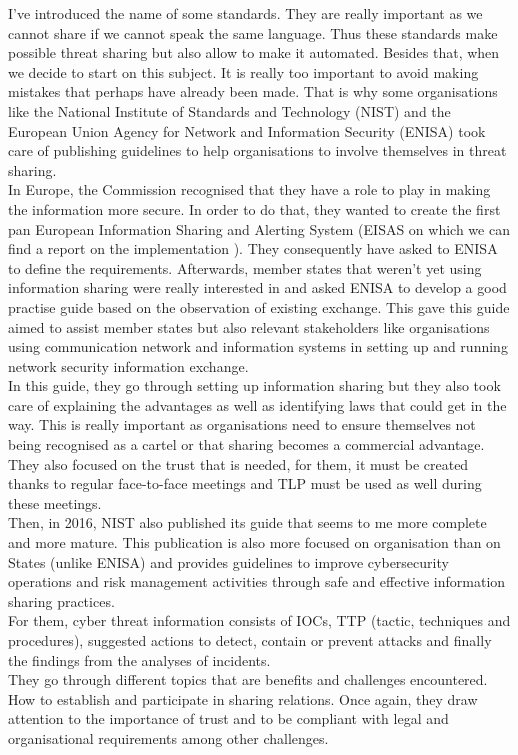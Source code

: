 \documentclass{eplmastersthesis}
\begin{document}
I've introduced the name of some standards. They are really important as we cannot share if we cannot speak the same language. Thus these standards make possible threat sharing but also allow to make it automated. Besides that, when we decide to start on this subject. It is really too important to avoid making mistakes that perhaps have already been made. That is why some organisations like the National Institute of Standards and Technology (NIST) and the European Union Agency for Network and Information Security (ENISA) took care of publishing guidelines to help organisations to involve themselves in threat sharing.\\
In Europe, the Commission recognised that they have a role to play in making the information more secure. In order to do that, they wanted to create the first pan European Information Sharing and Alerting System (EISAS on which we can find a report on the implementation \cite{eisasRapport}).  They consequently have asked to ENISA to define the requirements. Afterwards, member states that weren't yet using information sharing were really interested in and asked ENISA to develop a good practise guide based on the observation of existing exchange. This gave this guide \cite{enisaguide2009} aimed to assist member states but also relevant stakeholders like organisations using communication network and information systems in setting up and running network security information exchange.\\
In this guide, they go through setting up information sharing but they also took care of explaining the advantages as well as identifying laws that could get in the way. This is really important as organisations need to ensure themselves not being recognised as a cartel or that sharing becomes a commercial advantage. They also focused on the trust that is needed, for them, it must be created thanks to regular face-to-face meetings and TLP must be used as well during these meetings.\\
Then, in 2016, NIST also published its guide \cite{johnson2014guide} that seems to me more complete and more mature. This publication is also more focused on organisation than on States (unlike ENISA) and provides guidelines to improve cybersecurity operations and risk management activities through safe and effective information sharing practices.\\
For them, cyber threat information consists of IOCs, TTP (tactic, techniques and procedures), suggested actions to detect, contain or prevent attacks and finally the findings from the analyses of incidents. \\
They go through different topics that are benefits and challenges encountered. How to establish and participate in sharing relations. Once again, they draw attention to the importance of trust and to be compliant with legal and organisational requirements among other challenges.\\
\end{document}
